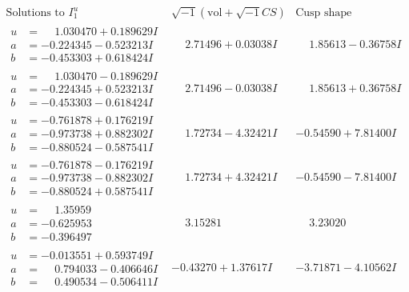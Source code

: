 \documentclass[1p]{elsarticle_modified}
\theoremstyle{definition}
\newcommand{\I}{\sqrt{-1}}
\begin{document}
$$\begin{array}{c|c|c}  
\text{Solutions to }I^u_{1}& \I (\text{vol} + \sqrt{-1}CS) & \text{Cusp shape}\\
 \hline 
\begin{aligned}
u &= \phantom{-}1.030470 + 0.189629 I \\
a &= -0.224345 - 0.523213 I \\
b &= -0.453303 + 0.618424 I\end{aligned}
 & \phantom{-}2.71496 + 0.03038 I & \phantom{-}1.85613 - 0.36758 I \\ \hline\begin{aligned}
u &= \phantom{-}1.030470 - 0.189629 I \\
a &= -0.224345 + 0.523213 I \\
b &= -0.453303 - 0.618424 I\end{aligned}
 & \phantom{-}2.71496 - 0.03038 I & \phantom{-}1.85613 + 0.36758 I \\ \hline\begin{aligned}
u &= -0.761878 + 0.176219 I \\
a &= -0.973738 + 0.882302 I \\
b &= -0.880524 - 0.587541 I\end{aligned}
 & \phantom{-}1.72734 - 4.32421 I & -0.54590 + 7.81400 I \\ \hline\begin{aligned}
u &= -0.761878 - 0.176219 I \\
a &= -0.973738 - 0.882302 I \\
b &= -0.880524 + 0.587541 I\end{aligned}
 & \phantom{-}1.72734 + 4.32421 I & -0.54590 - 7.81400 I \\ \hline\begin{aligned}
u &= \phantom{-}1.35959\phantom{ +0.000000I} \\
a &= -0.625953\phantom{ +0.000000I} \\
b &= -0.396497\phantom{ +0.000000I}\end{aligned}
 & \phantom{-}3.15281\phantom{ +0.000000I} & \phantom{-}3.23020\phantom{ +0.000000I} \\ \hline\begin{aligned}
u &= -0.013551 + 0.593749 I \\
a &= \phantom{-}0.794033 - 0.406646 I \\
b &= \phantom{-}0.490534 - 0.506411 I\end{aligned}
 & -0.43270 + 1.37617 I & -3.71871 - 4.10562 I \\ \hline\begin{aligned}

\end{aligned}
\end{array}$$
\end{document}
